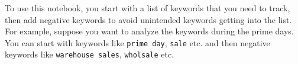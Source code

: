 \begin{outline}
    To use this notebook, you start with a list of keywords that you need to track, then add negative keywords to avoid unintended keywords getting into the list. For example, suppose you want to analyze the keywords during the prime days. You can start with keywords like \verb|prime day|, \verb|sale| etc. and then negative keywords like \verb|warehouse sales|, \verb|wholsale| etc.
\end{outline}